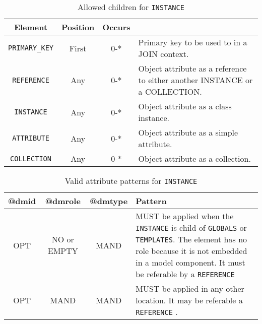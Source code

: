  
\begin{table}[!htbp]
\small
\centering
\begin{tabulary}{\linewidth}{|c |c |c|J|}
    \hline 
        \textbf{Element} &
        \textbf{Position} &
        \textbf{Occurs} &
        \\
    \hline      \hline  
        \texttt{PRIMARY\_KEY}  &        
        First &           
        0-* &
        Primary key to be used to in a JOIN context.\\
    \hline    
        \texttt{REFERENCE}  &        
        Any &           
        0-* &
         Object attribute as a reference to either another INSTANCE or a COLLECTION.\\
    \hline    
        \texttt{INSTANCE} &           
        Any &           
        0-* &
         Object attribute as a class instance. \\
    \hline    
        \texttt{ATTRIBUTE} &           
        Any &           
        0-* &
       Object attribute as a simple attribute. \\
    \hline    
        \texttt{COLLECTION} &           
        Any &           
        0-* &
         Object attribute  as a collection.\\
    \hline 
\end{tabulary}
     \caption{Allowed children for \texttt{INSTANCE}} 
     \label{tbl:instance-chilren}
\end{table}
 
\begin{table}[!htbp]
\small
\centering
\begin{tabulary}{\linewidth}{|c|c|c|J|}
    \hline 
        \textbf{@dmid} &
        \textbf{@dmrole} &
        \textbf{@dmtype} &
        \textbf{Pattern}\\
    \hline      \hline  
        OPT &           
        NO or EMPTY&           
        MAND &           
        MUST be applied when the  \texttt{INSTANCE} is child of \texttt{GLOBALS} or \texttt{TEMPLATES}. The element has no role because it is not embedded in a model component. It must be referable by a \texttt{REFERENCE}  \\
    \hline   
        OPT &           
        MAND &           
        MAND &           
        MUST be applied in any other location. It may be referable a \texttt{REFERENCE} . \\
   \hline 
\end{tabulary}
     \caption{Valid attribute patterns for  \texttt{INSTANCE}} 
     \label{tbl:instance-pattern}
 \end{table}       
\newpage

 
